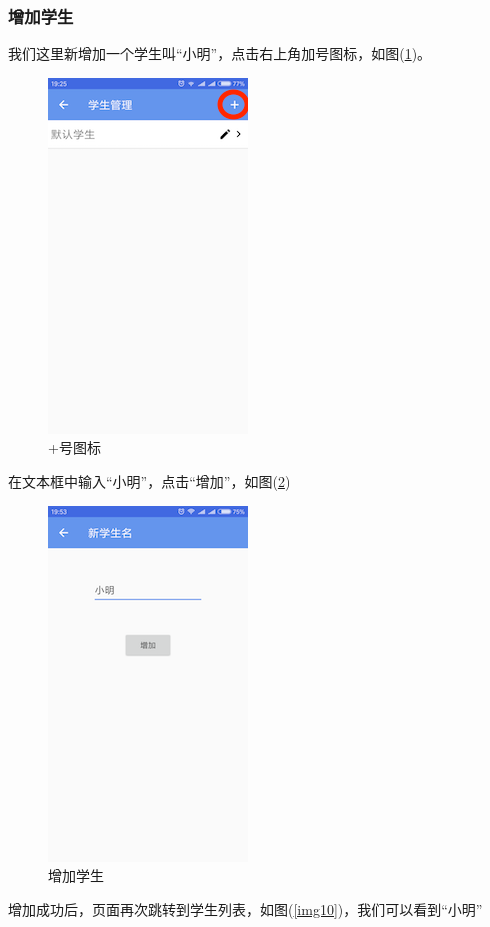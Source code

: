 \subsubsection{增加学生}
我们这里新增加一个学生叫“小明”，点击右上角加号图标，如图(\ref{img8})。
\begin{figure}[H]
	\centering
	\includegraphics{img/8.png}
	\caption{+号图标}
	\label{img8}
\end{figure}

在文本框中输入“小明”，点击“增加”，如图(\ref{img9})
\begin{figure}[H]
	\centering
	\includegraphics{img/9.png}
	\caption{增加学生}
	\label{img9}
\end{figure}

增加成功后，页面再次跳转到学生列表，如图(\ref{img10})，我们可以看到“小明”

